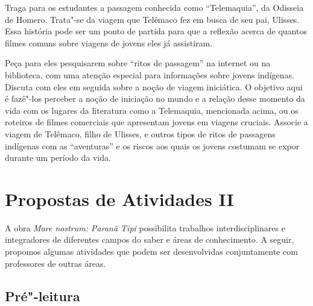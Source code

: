 \documentclass[12pt]{extarticle}
\begin{document}
Traga para os estudantes a passagem conhecida como ``Telemaquia'', da Odisseia de Homero. Trata"-se da viagem que Telêmaco fez em busca de seu pai, Ulisses. Essa história pode ser um ponto de partida para que a reflexão acerca de quantos filmes comuns sobre viagens de jovens eles já assistiram.


Peça para eles pesquisarem sobre ``ritos de passagem''
na internet ou na biblioteca, com uma atenção especial para informações sobre jovens indígenas. Discuta com eles em seguida sobre a noção de viagem iniciática. O objetivo aqui é fazê"-los perceber a noção de iniciação no mundo e a relação desse momento da vida com os lugares da literatura como 
a Telemaquia, mencionada acima, ou os roteiros de filmes comerciais
que apresentam jovens em viagens cruciais. Associe a viagem de Telêmaco, filho de Ulisses, 
e outros tipos de ritos de passagens indígenas com as ``aventuras'' 
e os riscos aos quais os jovens costumam se expor durante um período da vida.


\section{Propostas de Atividades II}

A obra \emph{Mare nostrum: Paranã Tipi} possibilita trabalhos
interdisciplinares e integradores de diferentes campos do saber e áreas de conhecimento. A seguir, propomos algumas atividades que podem ser desenvolvidas conjuntamente com professores de outras áreas.


\subsection{Pré"-leitura}
\end{document}
